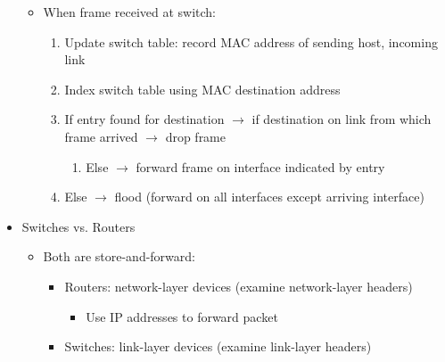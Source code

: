 \begin{itemize}
\begin{itemize}
      \item When frame received at switch:

        \begin{enumerate}

          \item Update switch table: record MAC address of sending host, incoming link

          \item Index switch table using MAC destination address

          \item If entry found for destination $\to$ if destination on link from which frame arrived $\to$ drop frame

            \begin{enumerate}

              \item Else $\to$ forward frame on interface indicated by entry

            \end{enumerate}

          \item Else $\to$ flood (forward on all interfaces except arriving interface)

        \end{enumerate}

    \end{itemize}

  \item Switches vs. Routers

    \begin{itemize}

      \item Both are store-and-forward:

        \begin{itemize}

          \item Routers: network-layer devices (examine network-layer headers)

            \begin{itemize}

              \item Use IP addresses to forward packet

            \end{itemize}

          \item Switches: link-layer devices (examine link-layer headers)

            \begin{itemize}


\end{itemize}
\end{itemize}
\end{itemize}
\end{itemize}
